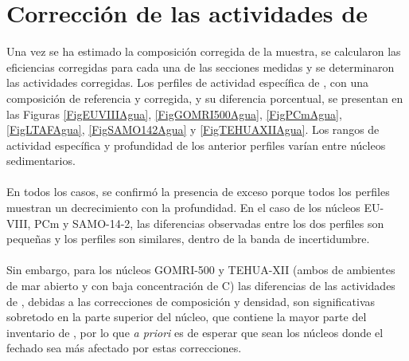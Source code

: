 	\section{Corrección de las actividades de \PbCero}\label{Seccion-Correccion}
Una vez se ha estimado la composición corregida de la muestra, se calcularon las eficiencias corregidas para cada una de las secciones medidas y se determinaron las actividades corregidas. Los perfiles de actividad específica de \PbCero, con una composición de referencia y corregida, y su diferencia porcentual, se presentan en las Figuras \ref{FigEUVIIIAgua}, \ref{FigGOMRI500Agua}, \ref{FigPCmAgua}, \ref{FigLTAFAgua}, \ref{FigSAMO142Agua} y \ref{FigTEHUAXIIAgua}. Los rangos de actividad específica y profundidad de los anterior perfiles varían entre núcleos sedimentarios.
\\
\\
En todos los casos, se confirmó la presencia de exceso porque todos los perfiles muestran un decrecimiento con la profundidad. En el caso de los núcleos EU-VIII, PCm y SAMO-14-2, las diferencias observadas entre los dos perfiles son pequeñas y los perfiles son similares, dentro de la banda de incertidumbre. 
\\
\\
Sin embargo, para los núcleos GOMRI-500 y TEHUA-XII (ambos de ambientes de mar abierto y con baja concentración de C) las diferencias de las actividades de \PbCero, debidas a las correcciones de composición y densidad, son significativas sobretodo en la parte superior del núcleo, que contiene la mayor parte del inventario de \PbCeroEx, por lo que \textit{a priori} es de esperar que sean los núcleos donde el fechado sea más afectado por estas correcciones.
